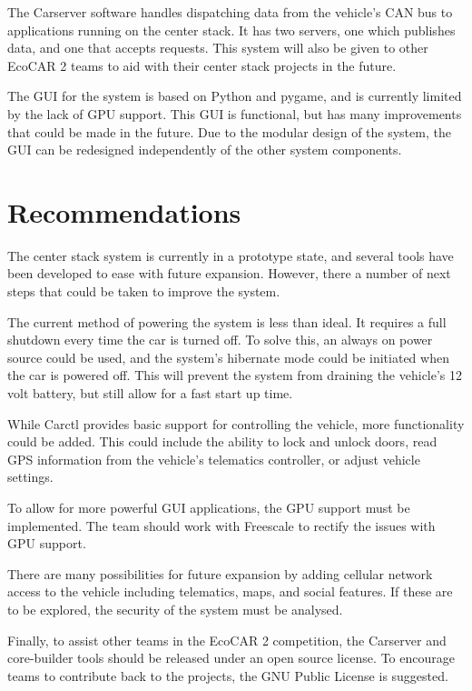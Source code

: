 \documentclass[ece]{uw-wkrpt}
\begin{document}
The Carserver software handles dispatching data from the vehicle's CAN bus to
applications running on the center stack. It has two servers, one which
publishes data, and one that accepts requests. This system will also be given to
other EcoCAR 2 teams to aid with their center stack projects in the future.

The GUI for the system is based on Python and pygame, and is currently limited
by the lack of GPU support. This GUI is functional, but has many improvements
that could be made in the future. Due to the modular design of the system, the
GUI can be redesigned independently of the other system components.

\section{Recommendations}

The center stack system is currently in a prototype state, and several tools
have been developed to ease with future expansion. However, there a number of
next steps that could be taken to improve the system.

The current method of powering the system is less than ideal. It requires a full
shutdown every time the car is turned off. To solve this, an always on power
source could be used, and the system's hibernate mode could be initiated when
the car is powered off. This will prevent the system from draining the vehicle's
12 volt battery, but still allow for a fast start up time.

While Carctl provides basic support for controlling the vehicle, more
functionality could be added. This could include the ability to lock and unlock
doors, read GPS information from the vehicle's telematics controller, or adjust
vehicle settings.

To allow for more powerful GUI applications, the GPU support must be
implemented. The team should work with Freescale to rectify the issues with GPU
support.

There are many possibilities for future expansion by adding cellular network
access to the vehicle including telematics, maps, and social features. If these
are to be explored, the security of the system must be analysed.

Finally, to assist other teams in the EcoCAR 2 competition, the Carserver and
core-builder tools should be released under an open source license. To encourage
teams to contribute back to the projects, the GNU Public License \cite{ref:gpl} 
is suggested.
\end{document}
